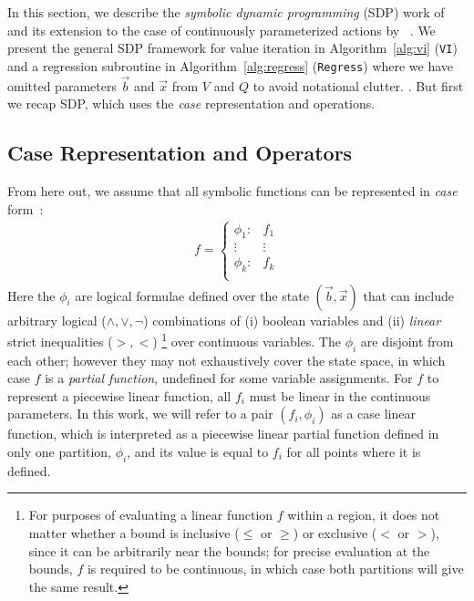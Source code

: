 \label{sec:sdp}

In this section, we describe the \emph{symbolic dynamic programming}
(SDP) work of~\cite{sanner_uai12} and its extension to the case of continuously
parameterized actions by ~\cite{sanner_aaai12}.  We present the general SDP
framework for value iteration in Algorithm~\ref{alg:vi} (\texttt{VI})
and a regression subroutine in Algorithm~\ref{alg:regress}
(\texttt{Regress}) where we have omitted parameters $\vec{b}$ and
$\vec{x}$ from $V$ and $Q$ to avoid notational clutter.  .
But first we recap SDP,
which uses the \emph{case} representation and operations.

\subsection{Case Representation and Operators}

From here out, we assume that all symbolic functions
can be represented in \emph{case} form~\cite{fomdp}:
{%
\begin{align}
f = 
\begin{cases}
  \phi_1: & f_1 \\ 
 \vdots&\vdots\\ 
  \phi_k: & f_k \\ 
\end{cases} \label{eq:case}
\end{align}
}
Here the $\phi_i$ are logical formulae defined over the state
$(\vec{b},\vec{x})$ that can include arbitrary logical ($\land,\lor,\neg$)
combinations of (i) boolean variables and (ii) 
\emph{linear} strict inequalities ($>,<$) \footnote{ For purposes of evaluating
a linear function $f$ within a region, it does not matter whether a bound is inclusive ($\leq$ or $\geq$) or exclusive ($<$ or $>$), since it can be arbitrarily near the bounds; for precise evaluation at the bounds, $f$ is required to be continuous, in which case both partitions will give the same result.}
over continuous variables.  
The $\phi_i$ are disjoint from each other;  however they may not exhaustively cover the state space, in which case $f$ is a \emph{partial function}, undefined for some
variable assignments. For $f$ to represent a piecewise linear function, all $f_i$ must be linear in the continuous parameters. In this work, we will refer to a pair $( f_i, \phi_i)$ as a case linear function, which is interpreted as a piecewise linear partial function defined in only one partition, $\phi_i$, and its value is equal to $f_i$ for all points where it is defined.

